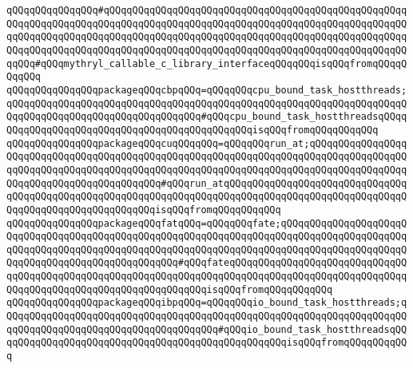 \verb|qQQqqQQqqQQqqQQq#qQQqqQQqqQQqqQQqqQQqqQQqqQQqqQQqqQQqqQQqqQQqqQQqqQQqqQQqqQQqqQQqqQQqqQQqqQQqqQQqqQQqqQQqqQQqqQQqqQQqqQQqqQQqqQQqqQQqqQQqqQQqqQQqqQQqqQQqqQQqqQQqqQQqqQQqqQQqqQQqqQQqqQQqqQQqqQQqqQQqqQQqqQQqqQQqqQQqqQQqqQQqqQQqqQQqqQQqqQQqqQQqqQQqqQQqqQQqqQQqqQQqqQQqqQQqqQQqqQQqqQQqqQQq#qQQqmythryl_callable_c_library_interfaceqQQqqQQqisqQQqfromqQQqqQQqqQQq|\newline
\verb|qQQqqQQqqQQqqQQqpackageqQQqcbpqQQq=qQQqqQQqcpu_bound_task_hostthreads;qQQqqQQqqQQqqQQqqQQqqQQqqQQqqQQqqQQqqQQqqQQqqQQqqQQqqQQqqQQqqQQqqQQqqQQqqQQqqQQqqQQqqQQqqQQqqQQqqQQqqQQq#qQQqcpu_bound_task_hostthreadsqQQqqQQqqQQqqQQqqQQqqQQqqQQqqQQqqQQqqQQqqQQqqQQqisqQQqfromqQQqqQQqqQQq|\newline
\verb|qQQqqQQqqQQqqQQqpackageqQQqcuqQQqqQQq=qQQqqQQqrun_at;qQQqqQQqqQQqqQQqqQQqqQQqqQQqqQQqqQQqqQQqqQQqqQQqqQQqqQQqqQQqqQQqqQQqqQQqqQQqqQQqqQQqqQQqqQQqqQQqqQQqqQQqqQQqqQQqqQQqqQQqqQQqqQQqqQQqqQQqqQQqqQQqqQQqqQQqqQQqqQQqqQQqqQQqqQQqqQQqqQQqqQQq#qQQqrun_atqQQqqQQqqQQqqQQqqQQqqQQqqQQqqQQqqQQqqQQqqQQqqQQqqQQqqQQqqQQqqQQqqQQqqQQqqQQqqQQqqQQqqQQqqQQqqQQqqQQqqQQqqQQqqQQqqQQqqQQqqQQqqQQqisqQQqfromqQQqqQQqqQQq|\newline
\verb|qQQqqQQqqQQqqQQqpackageqQQqfatqQQq=qQQqqQQqfate;qQQqqQQqqQQqqQQqqQQqqQQqqQQqqQQqqQQqqQQqqQQqqQQqqQQqqQQqqQQqqQQqqQQqqQQqqQQqqQQqqQQqqQQqqQQqqQQqqQQqqQQqqQQqqQQqqQQqqQQqqQQqqQQqqQQqqQQqqQQqqQQqqQQqqQQqqQQqqQQqqQQqqQQqqQQqqQQqqQQqqQQqqQQqqQQq#qQQqfateqQQqqQQqqQQqqQQqqQQqqQQqqQQqqQQqqQQqqQQqqQQqqQQqqQQqqQQqqQQqqQQqqQQqqQQqqQQqqQQqqQQqqQQqqQQqqQQqqQQqqQQqqQQqqQQqqQQqqQQqqQQqqQQqqQQqqQQqisqQQqfromqQQqqQQqqQQq|\newline
\verb|qQQqqQQqqQQqqQQqpackageqQQqibpqQQq=qQQqqQQqio_bound_task_hostthreads;qQQqqQQqqQQqqQQqqQQqqQQqqQQqqQQqqQQqqQQqqQQqqQQqqQQqqQQqqQQqqQQqqQQqqQQqqQQqqQQqqQQqqQQqqQQqqQQqqQQqqQQqqQQq#qQQqio_bound_task_hostthreadsqQQqqQQqqQQqqQQqqQQqqQQqqQQqqQQqqQQqqQQqqQQqqQQqqQQqisqQQqfromqQQqqQQqqQQq|\newline

